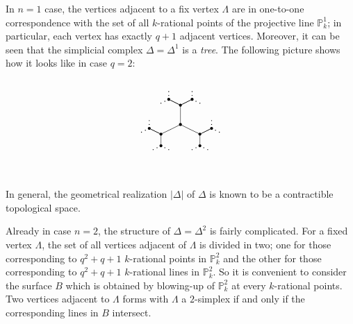 \begin{appexa}[$n=1$ case]
In $n=1$ case, the vertices adjacent to a fix vertex $\Lambda$ are in 
one-to-one correspondence with the set of all $k$-rational points of
the projective line $\mathbb{P}^1_k$; in particular, each vertex has 
exactly $q+1$ adjacent vertices.
Moreover, it can be seen that the simplicial complex $\Delta=\Delta^1$
is a {\it tree}.
The following picture shows how it looks like in case $q=2$:
$$
\setlength{\unitlength}{1pt}
\begin{picture}(200,100)(0,0)
\put(100,50){\circle*{3}}
\put(100,50){\line(0,1){20}}\put(100,70){\circle*{3}}
\put(100,50){\line(2,-1){20}}\put(120,40){\circle*{3}}
\put(100,50){\line(-2,-1){20}}\put(80,40){\circle*{3}}
%
\put(100,70){\line(2,1){12}}\put(112,76){\circle*{3}}
\put(100,70){\line(-2,1){12}}\put(88,76){\circle*{3}}
\put(120,40){\line(0,-1){12}}\put(120,28){\circle*{3}}
\put(120,40){\line(2,1){12}}\put(132,46){\circle*{3}}
\put(80,40){\line(0,-1){12}}\put(80,28){\circle*{3}}
\put(80,40){\line(-2,1){12}}\put(68,46){\circle*{3}}
%
\multiput(112,76)(0,4){3}{\circle*{.3}}
\multiput(112,76)(4,-2){3}{\circle*{.3}}
\multiput(88,76)(0,4){3}{\circle*{.3}}
\multiput(88,76)(-4,-2){3}{\circle*{.3}}
\multiput(120,28)(4,-2){3}{\circle*{.3}}
\multiput(120,28)(-4,-2){3}{\circle*{.3}}
\multiput(132,46)(0,4){3}{\circle*{.3}}
\multiput(132,46)(4,-2){3}{\circle*{.3}}
\multiput(80,28)(4,-2){3}{\circle*{.3}}
\multiput(80,28)(-4,-2){3}{\circle*{.3}}
\multiput(68,46)(0,4){3}{\circle*{.3}}
\multiput(68,46)(-4,-2){3}{\circle*{.3}}
\end{picture}\vspace{-1ex}
$$
\end{appexa}

In general, the geometrical realization $|\Delta|$ of $\Delta$ is known
to be a contractible topological space.

\begin{appexa}[$n=2$ case]\label{appexa-B}
Already in case $n=2$, the structure of $\Delta=\Delta^2$ is fairly
complicated.
For a fixed vertex $\Lambda$, the set of all vertices adjacent of 
$\Lambda$ is divided in two; one for those corresponding to $q^2+q+1$
$k$-rational points in $\mathbb{P}^2_k$ and the other for those
corresponding to $q^2+q+1$ $k$-rational lines in $\mathbb{P}^2_k$.
So it is convenient to consider the surface $B$ which is obtained by
blowing-up of $\mathbb{P}^2_k$ at every $k$-rational points.
Two vertices adjacent to $\Lambda$ forms with $\Lambda$ a $2$-simplex
if and only if the corresponding lines in $B$ intersect.
\end{appexa}

